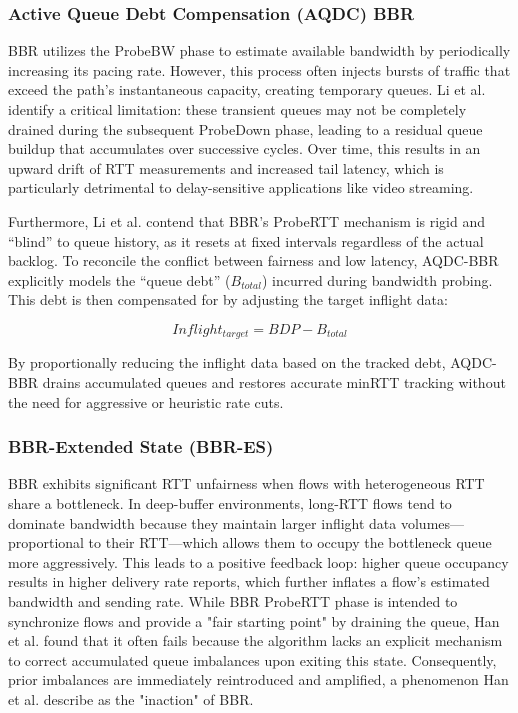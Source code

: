 \subsubsection{Active Queue Debt Compensation (AQDC) BBR}

BBR utilizes the ProbeBW phase to estimate available bandwidth by periodically increasing its pacing rate. 
However, this process often injects bursts of traffic that exceed the path's instantaneous capacity, creating temporary queues. 
Li et al. \cite{AQDCBBR} identify a critical limitation: these transient queues may not be completely drained during the subsequent ProbeDown phase, leading to a residual queue buildup that accumulates over successive cycles. 
Over time, this results in an upward drift of \ac{RTT} measurements and increased tail latency, which is particularly detrimental to delay-sensitive applications like video streaming.

Furthermore, Li et al. contend that BBR's ProbeRTT mechanism is rigid and ``blind'' to queue history, as it resets at fixed intervals regardless of the actual backlog. 
To reconcile the conflict between fairness and low latency, AQDC-BBR explicitly models the ``queue debt'' ($B_{total}$) incurred during bandwidth probing. 
This debt is then compensated for by adjusting the target inflight data:

\begin{equation}
    Inflight_{target} = BDP - B_{total}
\end{equation}

By proportionally reducing the inflight data based on the tracked debt, AQDC-BBR drains accumulated queues and restores accurate minRTT tracking without the need for aggressive or heuristic rate cuts.

\subsubsection{BBR-Extended State (BBR-ES)}
BBR exhibits significant \ac{RTT} unfairness when flows with heterogeneous \acs{RTT} share a bottleneck\cite{BBRES}. 
In deep-buffer environments, long-RTT flows tend to dominate bandwidth because they maintain larger inflight data volumes—proportional to their RTT—which allows them to occupy the bottleneck queue more aggressively. 
This leads to a positive feedback loop: higher queue occupancy results in higher delivery rate reports, which further inflates a flow's estimated bandwidth and sending rate. 
While \ac{BBR} ProbeRTT phase is intended to synchronize flows and provide a "fair starting point" by draining the queue, Han et al. found that it often fails because the algorithm lacks an explicit mechanism to correct accumulated queue imbalances upon exiting this state. 
Consequently, prior imbalances are immediately reintroduced and amplified, a phenomenon Han et al. describe as the "inaction" of BBR.

